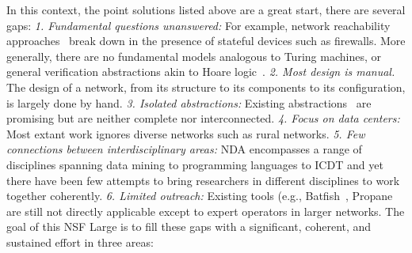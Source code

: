 In this context, the point solutions listed above are a great start, there are several gaps: {\em 1. Fundamental questions unanswered:}  For example, network reachability
approaches~\cite{hsa,veriflow} break down in the presence of stateful
devices such as firewalls.  More generally, there are no fundamental
models analogous to Turing machines, or general verification
abstractions akin to Hoare logic~\cite{Hoare69}. {\em 2. Most design
  is manual.} The design of a network, from its structure to its
components to its configuration, is largely done by hand. {\em
  3. Isolated abstractions:} Existing
abstractions~\cite{netkat,propane,hsa,Ethane,4DControlPlane} are promising but are neither
complete nor interconnected. {\em 4. Focus on data centers:} Most
extant work ignores diverse networks such
as rural networks. {\em  5. Few connections between
  interdisciplinary areas:} NDA encompasses a range of disciplines
spanning data mining to programming languages to ICDT and yet there have been
few attempts to bring researchers in different disciplines to work together
coherently. {\em 6. Limited outreach:} Existing tools (e.g., Batfish~\cite{batfish}, Propane~\cite{propane} are still not directly
applicable except to expert operators in larger networks.
The goal of this NSF Large is to fill these gaps with a significant, coherent, and
sustained effort in three areas:



